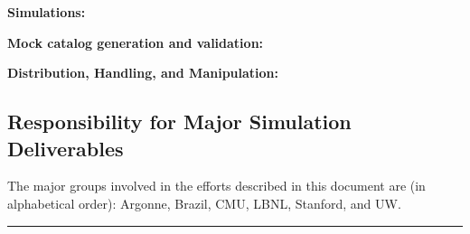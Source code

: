 {\bf Simulations:} 

{\bf Mock catalog generation and validation:}

{\bf Distribution, Handling, and Manipulation:}

\subsection{Responsibility for Major Simulation Deliverables}

The major groups involved in the efforts described in this document are (in alphabetical order): Argonne, Brazil, CMU, LBNL, Stanford, and UW.   


\vspace{\baselineskip}
\hrule
\clearpage
